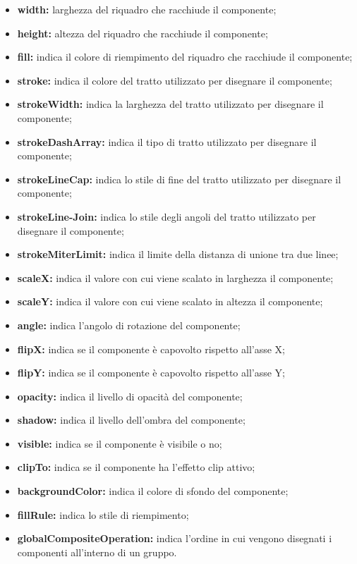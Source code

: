 \begin{itemize}
\begin{itemize}
			\item \textbf{width:} larghezza del riquadro che racchiude il componente;
			\item \textbf{height:} altezza del riquadro che racchiude il componente;
			\item \textbf{fill:} indica il colore di riempimento del riquadro che racchiude il componente;
			\item \textbf{stroke:} indica il colore del tratto utilizzato per disegnare il componente;
			\item \textbf{strokeWidth:} indica la larghezza del tratto utilizzato per disegnare il componente;
			\item \textbf{strokeDashArray:} indica il tipo di tratto utilizzato per disegnare il componente;
			\item \textbf{strokeLineCap:} indica lo stile di fine del tratto utilizzato per disegnare il componente;
			\item \textbf{strokeLine-Join:} indica lo stile degli angoli del tratto utilizzato per disegnare il componente;
			\item \textbf{strokeMiterLimit:} indica il limite della distanza di unione tra due linee;
			\item \textbf{scaleX:} indica il valore con cui viene scalato in larghezza il componente;
			\item \textbf{scaleY:} indica il valore con cui viene scalato in altezza il componente;
			\item \textbf{angle:} indica l'angolo di rotazione del componente;
			\item \textbf{flipX:} indica se il componente è capovolto rispetto all'asse X;
			\item \textbf{flipY:} indica se il componente è capovolto rispetto all'asse Y;
			\item \textbf{opacity:} indica il livello di opacità del componente;
			\item \textbf{shadow:} indica il livello dell'ombra del componente;
			\item \textbf{visible:} indica  se il componente è visibile o no;
			\item \textbf{clipTo:} indica se il componente ha l'effetto clip attivo;
			\item \textbf{backgroundColor:} indica il colore di sfondo del componente;
			\item \textbf{fillRule:} indica lo stile di riempimento;
			\item \textbf{globalCompositeOperation:} indica l'ordine in cui vengono disegnati i componenti all'interno di un gruppo.
		\end{itemize}
	\end{itemize}
\newpage

